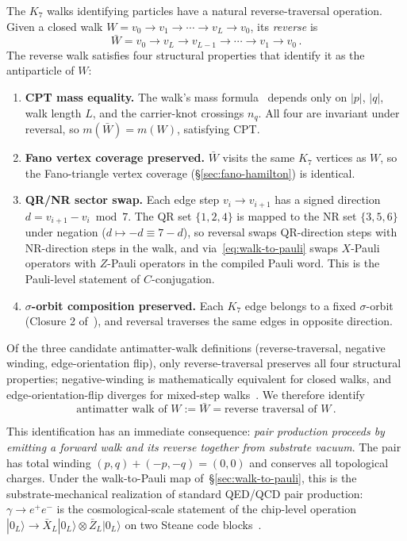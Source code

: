 \documentclass[11pt]{article}
\newcommand{\barX}{\bar X_L}
\newcommand{\barZ}{\bar Z_L}
\begin{document}
The $K_7$ walks identifying particles have a natural reverse-traversal operation.  Given a closed walk $W = v_0 \to v_1 \to \cdots \to v_L \to v_0$, its \emph{reverse} is
\begin{equation}
  \bar W = v_0 \to v_L \to v_{L - 1} \to \cdots \to v_1 \to v_0 \, .
\end{equation}
The reverse walk satisfies four structural properties that identify it as the antiparticle of $W$:
\begin{enumerate}
\item \textbf{CPT mass equality.}  The walk's mass formula~\cite{Paper6} depends only on $|p|$, $|q|$, walk length $L$, and the carrier-knot crossings $n_q$.  All four are invariant under reversal, so $m(\bar W) = m(W)$, satisfying CPT.
\item \textbf{Fano vertex coverage preserved.}  $\bar W$ visits the same $K_7$ vertices as $W$, so the Fano-triangle vertex coverage (\S\ref{sec:fano-hamilton}) is identical.
\item \textbf{QR/NR sector swap.}  Each edge step $v_i \to v_{i + 1}$ has a signed direction $d = v_{i + 1} - v_i \bmod 7$.  The QR set $\{1, 2, 4\}$ is mapped to the NR set $\{3, 5, 6\}$ under negation ($d \mapsto -d \equiv 7 - d$), so reversal swaps QR-direction steps with NR-direction steps in the walk, and via~\eqref{eq:walk-to-pauli} swaps $X$-Pauli operators with $Z$-Pauli operators in the compiled Pauli word.  This is the Pauli-level statement of $C$-conjugation.
\item \textbf{$\sigma$-orbit composition preserved.}  Each $K_7$ edge belongs to a fixed $\sigma$-orbit (Closure 2 of~\cite{Paper22}), and reversal traverses the same edges in opposite direction.
\end{enumerate}
Of the three candidate antimatter-walk definitions (reverse-traversal, negative winding, edge-orientation flip), only reverse-traversal preserves all four structural properties; negative-winding is mathematically equivalent for closed walks, and edge-orientation-flip diverges for mixed-step walks~\cite{Paper23Memo}.  We therefore identify
\begin{equation}
  \boxed{\text{antimatter walk of $W$} := \bar W = \text{reverse traversal of $W$}\, .}
  \label{eq:antimatter-walk}
\end{equation}

This identification has an immediate consequence: \emph{pair production proceeds by emitting a forward walk and its reverse together from substrate vacuum}.  The pair has total winding $(p, q) + (-p, -q) = (0, 0)$ and conserves all topological charges.  Under the walk-to-Pauli map of~\S\ref{sec:walk-to-pauli}, this is the substrate-mechanical realization of standard QED/QCD pair production: $\gamma \to e^+ e^-$ is the cosmological-scale statement of the chip-level operation $|0_L\rangle \to \barX|0_L\rangle \otimes \barZ|0_L\rangle$ on two Steane code blocks~\cite{Paper21b}.
\end{document}
